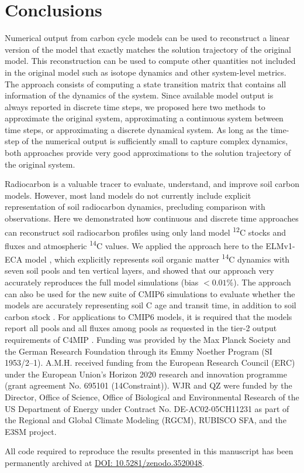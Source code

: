 \documentclass[draft]{agujournal2019}
\begin{document}
\section{Conclusions}
Numerical output from carbon cycle models can be used to reconstruct a linear version of the model that exactly matches the solution trajectory of the original model. This reconstruction can be used to compute other quantities not included in the original model such as isotope dynamics and other system-level metrics. The approach consists of computing a state transition matrix that contains all information of the dynamics of the system. Since available model output is always reported in discrete time steps, we proposed here two methods to approximate the original system, approximating a continuous system between time steps, or approximating a discrete dynamical system. As long as the time-step of the numerical output is sufficiently small to capture complex dynamics, both approaches provide very good approximations to the solution trajectory of the original system. 

Radiocarbon is a valuable tracer to evaluate, understand, and improve soil carbon models. However, most land models do not currently include explicit representation of soil radiocarbon dynamics, precluding comparison with observations. Here we demonstrated how continuous and discrete time approaches can reconstruct soil radiocarbon profiles using only land model \textsuperscript{12}C stocks and fluxes and atmospheric \textsuperscript{14}C values. We applied the approach here to the ELMv1-ECA model \cite{Zhu2019, Riley2018,Tang2018EI}, which explicitly represents soil organic matter \textsuperscript{14}C dynamics with seven soil pools and ten vertical layers, and showed that our approach very accurately reproduces the full model simulations (bias $<0.01$\%). The approach can also be used for the new suite of CMIP6 simulations to evaluate whether the models are accurately representing soil C age and transit time, in addition to soil carbon stock \cite{He2016, Lawrence2019}. For applications to CMIP6 models, it is required that the models report all pools and all fluxes among pools as requested in the tier-2 output requirements of C4MIP  \cite{Jones2016}.
\acknowledgments
Funding was provided by the Max Planck Society and the German Research Foundation through its Emmy Noether Program (SI 1953/2--1). A.M.H. received funding from the European Research Council (ERC) under the European Union’s Horizon 2020 research and innovation programme (grant agreement No. 695101 (14Constraint)). WJR and QZ were funded by the Director, Office of Science, Office of Biological and Environmental Research of the US Department of Energy under Contract No. DE-AC02-05CH11231 as part of the Regional and Global Climate Modeling (RGCM), RUBISCO SFA, and the E3SM project.

All code required to reproduce the results presented in this manuscript has been permanently archived at \url{DOI: 10.5281/zenodo.3520048}.

%
%

\end{document}
